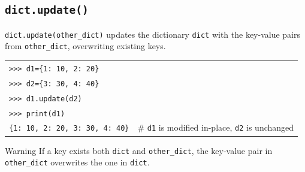 \documentclass[t,handout,9pt]{beamer}
\begin{document}
\subsection{\texttt{dict.update()}}
\begin{frame}
\vfill
\texttt{dict.update(other\_dict)} updates the dictionary \texttt{dict} with the key-value pairs from \texttt{other\_dict}, overwriting existing keys.\\
\begin{table}[]
\begin{flushleft}
\begin{tabular}{ll}
\texttt{>{}>{}> d1=\{1: 10, 2: 20\}} &   \\
\texttt{>{}>{}> d2=\{3: 30, 4: 40\}} &   \\
\texttt{>{}>{}> d1.update(d2)} &   \\
\texttt{>{}>{}> print(d1)} &   \\
\texttt{\{1: 10, 2: 20, 3: 30, 4: 40\}} & \# \texttt{d1} is modified in-place, \texttt{d2} is unchanged\\
\end{tabular}
\end{flushleft}
\end{table}
\begin{block}{Warning}
If a key exists both \texttt{dict} and \texttt{other\_dict}, the key-value pair in \texttt{other\_dict} overwrites the one in \texttt{dict}.
\end{block}
\vspace{-0.3cm}
\begin{table}[]
\begin{flushleft}
\begin{tabular}{ll}

\end{tabular}
\end{flushleft}
\end{table}
\end{frame}
\end{document}

